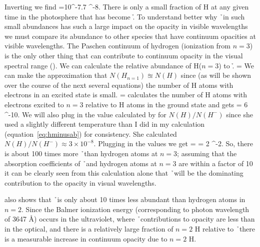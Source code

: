 Inverting we find 
\beq
\label{eq:hminusab}
=10^{-7.7}  ^{-8}.
\eeq
There is only a small fraction of H at any given time in the
photosphere that has become \h.  To understand better why \h\ in such
small abundances has such a large impact on the opacity in visible
wavelengths we must compare its abundance to other species that have
continuum opacities at visible wavelengths.  The Paschen continuum of
hydrogen (ionization from $n=3$) is the only other thing that can contribute
to continuum opacity in the visual spectral range
(\citealt{boehm1989}).  
We can calculate the relative abundance of H($n=3$) to \h.
\beq
  = 
\eeq
We can make the approximation that $N(H_{n=1})\approxeq N(H)$ since (as will be shown over the course of the next several equations) the number of H atoms with electrons in an excited state is small.
\beq
  = 
\eeq
\cite{boehm1989} calculates the number of H atoms with electrons excited to $n=3$ relative to H atoms in the ground state and gets
\beq
{} = 6  ^{-10}.
\eeq
We will also plug in the value calculated by \cite{boehm1989} for $N(H)/N(H^-)$ since she used a slightly different temperature than I did in my calculation (equation~\ref{eq:hminusab}) for consistency.  She calculated $N(H)/N(H^-) \approx 3 \times 10^{-8}$.  Plugging in the values we get
\beq
{} =  = 2 ^{-2}.
\eeq
So, there is about 100 times more \h\ than hydrogen atoms at $n=3$;
assuming that the absorption coefficients of \h\ and  hydrogen atoms
at $n=3$ are within a factor of 10 it can be clearly seen from this
calculation alone that \h\ will be the dominating contribution to the
opacity in visual wavelengths.

\cite{boehm1989} also shows that \h\ is only about 10 times less abundant than hydrogen atoms in $n=2$.  Since the Balmer ionization energy (corresponding to photon wavelength of 3647 \AA) occurs in the ultraviolet, where \h\ contributions to opacity are less than in the optical, and there is a relatively large fraction of $n=2$ H relative to \h\ there is a measurable increase in continuum opacity due to $n=2$ H.  %

